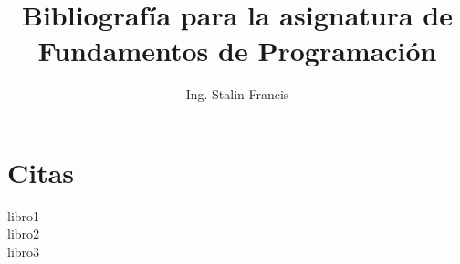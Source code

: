 \documentclass[a4paper,12pt,draft]{scrartcl}
\title{Bibliografía para la asignatura de Fundamentos de Programación}
\author{Ing. Stalin Francis}
\begin{document}
\maketitle

\section{Citas}
\label{sec:citas}


\noindent
libro1~\cite{horton19:_begin_c_game_progr}\\
libro2~\cite{williams2019c++}\\
libro3~\cite{DongYang+2019}



\end{document}
